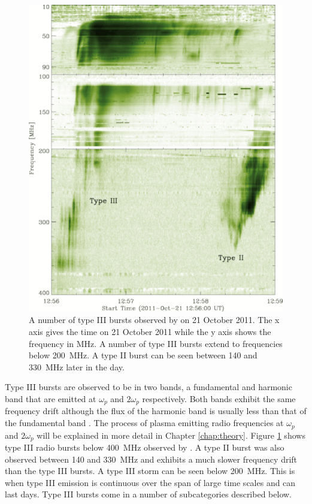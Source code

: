 \begin{figure}[ht]
    \centering
    \includegraphics[width=0.75\columnwidth]{Images/Pietro_typeIII.png}
    \caption[A number of type III bursts observed by \cite{Zucca2012} on 21 October 2011.]{A number of type III bursts observed by \cite{Zucca2012} on 21 October 2011. The x axis gives the time on 21 October 2011 while the y axis shows the frequency in MHz. A number of type III bursts extend to frequencies below 200~MHz. A type II burst can be seen between 140 and 330~MHz later in the day.}
    \label{fig:bursts}
\end{figure}

Type III bursts are observed to be in two bands, a fundamental and harmonic band that are emitted at $\omega_p$ and $2 \omega_p$ respectively. Both bands exhibit the same frequency drift although the flux of the harmonic band is usually less than that of the fundamental band \citep{Wild1954a, McLean1985}. The process of plasma emitting radio frequencies at $\omega_p$ and $2 \omega_p$ will be explained in more detail in Chapter \ref{chap:theory}. 
Figure \ref{fig:bursts} shows type III radio bursts below 400~MHz observed by \cite{Zucca2012}. A type II burst was also observed between 140 and 330~MHz and exhibits a much slower frequency drift than the type III bursts. A type III storm can be seen below 200~MHz. This is when type III emission is continuous over the span of large time scales and can last days. Type III bursts come in a number of subcategories described below.

